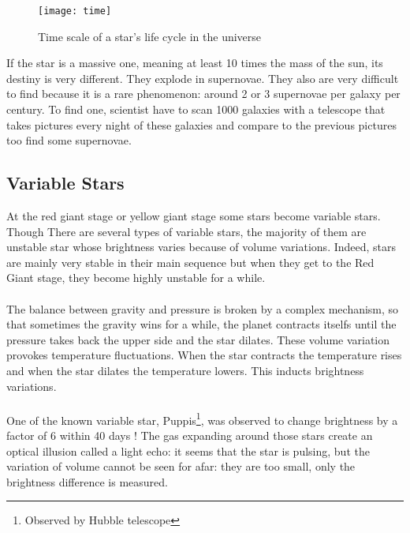 \documentclass[a4paper, 11pt]{article} %
\begin{document}
\begin{figure}[h]
\centering
\texttt{[image: time]}
\caption{Time scale of a star's life cycle in the universe}
\end{figure}

If the star is a massive one, meaning at least 10 times the mass of the sun, its destiny is very different. They explode in supernovae. They also are very difficult to find because it is a rare phenomenon: around 2 or 3 supernovae per galaxy per century. To find one, scientist have to scan 1000 galaxies with a telescope that takes pictures every night of these galaxies and compare to the previous pictures too find some supernovae.
\subsection{Variable Stars}

At the red giant stage or yellow giant stage some stars become variable stars. Though There are several types of variable stars, the majority of them are unstable star whose brightness varies because of volume variations. Indeed, stars are mainly very stable in their main sequence but when they get to the Red Giant stage, they become highly unstable for a while. 





\paragraph*{}
The balance between gravity and pressure is broken by a complex mechanism, so that sometimes the gravity wins for a while, the planet contracts itselfs until the pressure takes back the upper side and the star dilates. These volume variation provokes temperature fluctuations. When the star contracts the temperature rises and when the star dilates the temperature lowers. This inducts brightness variations. 
\paragraph*{}
One of the known variable star, Puppis\footnote{Observed by Hubble telescope}, was observed to change brightness by a factor of 6 within 40 days ! The gas expanding around those stars create an optical illusion called a light echo: it seems that the star is pulsing, but the variation of volume cannot be seen for afar: they are too small, only the brightness difference is measured.
\end{document}
